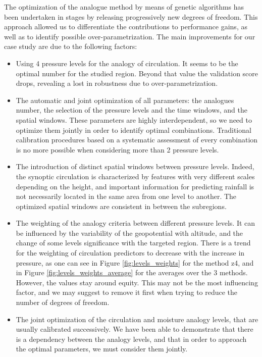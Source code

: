 \documentclass[5p]{elsarticle}
\begin{document}
The optimization of the analogue method by means of genetic algorithms has been undertaken in stages by releasing progressively new degrees of freedom. This approach allowed us to differentiate the contributions to performance gains, as well as to identify possible over-parametrization. The main improvements for our case study are due to the following factors:

\begin{itemize}
	\item Using 4 pressure levels for the analogy of circulation. It seems to be the optimal number for the studied region. Beyond that value the validation score drops, revealing a lost in robustness due to over-parametrization.
	\item The automatic and joint optimization of all parameters: the analogues number, the selection of the pressure levels and the time windows, and the spatial windows. These parameters are highly interdependent, so we need to optimize them jointly in order to identify optimal combinations. Traditional calibration procedures based on a systematic assessment of every combination is no more possible when considering more than 2 pressure levels.
	\item The introduction of distinct spatial windows between pressure levels. Indeed, the synoptic circulation is characterized by features with very different scales depending on the height, and important information for predicting rainfall is not necessarily located in the same area from one level to another. The optimized spatial windows are consistent in between the subregions.
	\item The weighting of the analogy criteria between different pressure levels. It can be influenced by the variability of the geopotential with altitude, and the change of some levels significance with the targeted region. There is a trend for the weighting of circulation predictors to decrease with the increase in pressure, as one can see in Figure \ref{fig:levels_weights} for the method z4, and in Figure \ref{fig:levels_weights_average} for the averages over the 3 methods. However, the values stay around equity. This may not be the most influencing factor, and we may suggest to remove it first when trying to reduce the number of degrees of freedom.
	\item The joint optimization of the circulation and moisture analogy levels, that are usually calibrated successively. We have been able to demonstrate that there is a dependency between the analogy levels, and that in order to approach the optimal parameters, we must consider them jointly.
\end{itemize}
\end{document}

